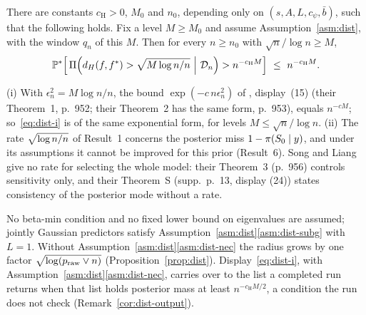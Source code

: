 \begin{theorem}\label{thm:dist}
There are constants $c_{\mathrm H}>0$, $M_0$ and $n_0$, depending only on $(s,A,L,c_\psi,\bar b)$, such that the following
holds. Fix a level $M\ge M_0$ and assume Assumption~\ref{asm:dist}, with the window $q_n$ of this $M$. Then for every
$n\ge n_0$ with $\sqrt n/\log n\ge M$,
\begin{equation}\label{eq:dist-i}
  \P^*\Big[\,\Pi\Big(d_H(f,f^*)>\sqrt{M\log n/n}\ \Big|\ \Dn\Big)>n^{-c_{\mathrm H} M}\Big]\ \le\ n^{-c_{\mathrm H} M}.
\end{equation}
\end{theorem}




\begin{remark}\label{rem:dist-form}
(i) With $\epsilon_n^2=M\log n/n$, the bound $\exp(-c\,n\epsilon_n^2)$ of \citet{SongLiang2015}, display~(15) (their
Theorem~1, p.~952; their Theorem~2 has the same form, p.~953), equals $n^{-cM}$; so~\eqref{eq:dist-i} is of the same
exponential form, for levels $M\le\sqrt n/\log n$.
(ii) The rate $\sqrt{\log n/n}$ of Result~1 concerns the posterior miss $1-\pi(S_0\mid y)$, and under its assumptions it cannot be improved
for this prior (Result~6). Song and Liang give no rate for selecting the whole model: their Theorem~3 (p.~956) controls
sensitivity only, and their Theorem~S (supp.\ p.~13, display (24)) states consistency of the posterior mode without
a rate.
\end{remark}

\begin{remark}\label{rem:dist-asm}
No beta-min condition and no fixed lower bound on eigenvalues are assumed; jointly Gaussian predictors satisfy
Assumption~\ref{asm:dist}\ref{asm:dist-subg} with $L=1$. Without Assumption~\ref{asm:dist}\ref{asm:dist-nec} the radius grows
by one factor $\sqrt{\log(p_{\mathrm{raw}}\vee n)}$ (Proposition~\ref{prop:dist}). Display~\eqref{eq:dist-i}, with
Assumption~\ref{asm:dist}\ref{asm:dist-nec}, carries over to the list a completed run returns when that list holds
posterior mass at least $n^{-c_{\mathrm H}M/2}$, a condition the run does not check
(Remark~\ref{cor:dist-output}).
\end{remark}

